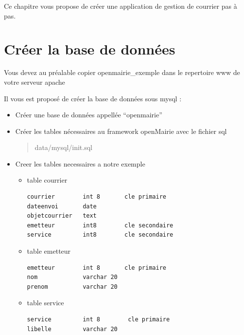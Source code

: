 \documentclass[letterpaper,10pt,french]{manual}
\begin{document}
\resetcurrentobjects
\hypertarget{--doc-utilisation/index}{}\hypertarget{index}{}
Ce chapitre vous propose de créer une application de gestion de courrier pas à pas.

\resetcurrentobjects
\hypertarget{--doc-utilisation/creer_base}{}

\hypertarget{creer-base}{}\section{Créer la base de données}

Vous devez au préalable copier openmairie\_exemple dans le repertoire www de votre serveur apache

Il vous est proposé de créer la base de données sous mysql :
\begin{itemize}
\item {} 
Créer une base de données appellée ``openmairie''

\item {} 
Créer les tables nécessaires au framework openMairie avec le fichier sql
\begin{quote}

data/mysql/init.sql
\end{quote}

\item {} 
Creer les tables necessaires a notre exemple
\begin{itemize}
\item {} 
table courrier

\begin{Verbatim}[commandchars=@\[\]]
courrier        int 8       cle primaire
dateenvoi       date
objetcourrier   text
emetteur        int8        cle secondaire
service         int8        cle secondaire
\end{Verbatim}

\item {} 
table emetteur

\begin{Verbatim}[commandchars=@\[\]]
emetteur        int 8       cle primaire
nom             varchar 20
prenom          varchar 20
\end{Verbatim}

\item {} 
table service

\begin{Verbatim}[commandchars=@\[\]]
service         int 8        cle primaire
libelle         varchar 20
\end{Verbatim}


\end{itemize}
\end{itemize}
\end{document}
